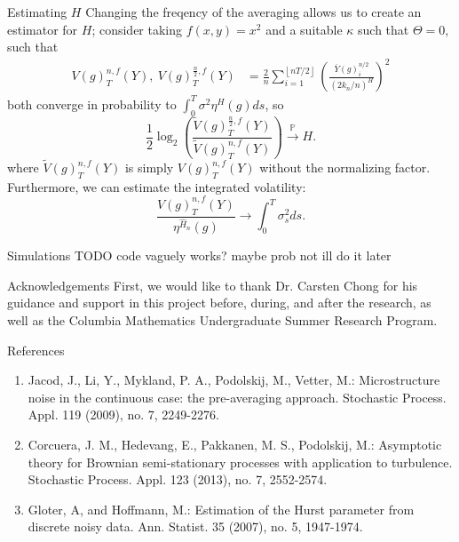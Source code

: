 \documentclass[final,hyperref={pdfpagelabels=false}]{beamer}
\begin{document}
\begin{frame}{}
\begin{columns}[t]
      \begin{column}{0.28\linewidth}
        \begin{block}{Estimating \(H\)}
          Changing the freqency of the averaging allows us to create an estimator for \(H\); consider taking \(f(x, y) = x^2\) and a suitable \(\kappa\) such that \(\Theta = 0\), such that 
          \begin{align*}
            V(g)^{n,f}_T(Y), \ V(g)^{\frac{n}{2},f}_T(Y) &= \frac{2}{n}\sum_{i=1}^{\left\lfloor nT/2 \right\rfloor} \left(\frac{\overline{Y}(g)^{n/2}_i}{(2k_n/n)^H}\right)^2
          \end{align*}
          both converge in probability to \( \int_0^T \sigma^2\eta^H(g) ds\), so
          \[
            \frac{1}{2} \log_2\left(\frac{\widetilde{V}(g)^{\frac{n}{2},f}_T(Y)}{\widetilde{V}(g)^{n,f}_T(Y)}\right) \overset{\mathbb{P}}{\rightarrow} H.
          \]
          where \(\widetilde{V}(g)^{n,f}_T(Y)\) is simply \(V(g)^{n,f}_T(Y)\) without the normalizing factor.
          Furthermore, we can estimate the integrated volatility:
          \[
            \frac{V(g)^{n,f}_T(Y)}{\eta^{\hat{H}_n}(g)} \rightarrow \int_0^T\sigma^2_sds.
          \]
        \end{block}
        \begin{block}{Simulations}
          TODO code vaguely works? maybe prob not ill do it later
        \end{block}
        \begin{block}{Acknowledgements}
          {\small
          First, we would like to thank Dr. Carsten Chong for his guidance and support in this project before, during, and after the research, as well as the Columbia Mathematics Undergraduate Summer Research Program.
        }
        \end{block}

        \begin{block}{References}
          {\footnotesize
          \begin{enumerate}
            \item Jacod, J., Li, Y., Mykland, P. A., Podolskij, M., Vetter, M.: Microstructure noise in the continuous case: the pre-averaging approach. Stochastic Process. Appl. 119 (2009), no. 7, 2249-2276.
            \item Corcuera, J. M., Hedevang, E., Pakkanen, M. S., Podolskij, M.: Asymptotic theory for Brownian semi-stationary processes with application to turbulence. Stochastic Process. Appl. 123 (2013), no. 7, 2552-2574.
            \item Gloter, A, and Hoffmann, M.: Estimation of the Hurst parameter from discrete noisy data. Ann. Statist. 35 (2007), no. 5, 1947-1974.
          \end{enumerate}
        }
        \end{block}

      \end{column}
    \end{columns}
  \end{frame}
\end{document}
